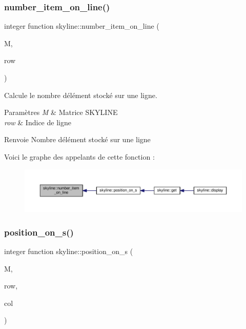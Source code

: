 \subsubsection{\texorpdfstring{number\+\_\+item\+\_\+on\+\_\+line()}{number\_item\_on\_line()}}
{\footnotesize\ttfamily integer function skyline\+::number\+\_\+item\+\_\+on\+\_\+line (\begin{DoxyParamCaption}\item[{class(\hyperlink{structskyline_1_1skyline__matrix}{skyline\+\_\+matrix}), intent(in)}]{M,  }\item[{integer, intent(in)}]{row }\end{DoxyParamCaption})}



Calcule le nombre d\textquotesingle{}élément stocké sur une ligne. 


\begin{DoxyParams}{Paramètres}
{\em M} & Matrice S\+K\+Y\+L\+I\+NE \\
\hline
{\em row} & Indice de ligne \\
\hline
\end{DoxyParams}
\begin{DoxyReturn}{Renvoie}
Nombre d\textquotesingle{}élément stocké sur une ligne 
\end{DoxyReturn}
Voici le graphe des appelants de cette fonction \+:
\nopagebreak
\begin{figure}[H]
\begin{center}
\leavevmode
\includegraphics[width=350pt]{namespaceskyline_a9f07218be321c12bea1d84f6b629e346_icgraph}
\end{center}
\end{figure}
\mbox{\label{namespaceskyline_a25b1e027d99abb67ab844d7b657a5843}} 
\subsubsection{\texorpdfstring{position\+\_\+on\+\_\+s()}{position\_on\_s()}}
{\footnotesize\ttfamily integer function skyline\+::position\+\_\+on\+\_\+s (\begin{DoxyParamCaption}\item[{class(\hyperlink{structskyline_1_1skyline__matrix}{skyline\+\_\+matrix}), intent(in)}]{M,  }\item[{integer, intent(in)}]{row,  }\item[{integer, intent(in)}]{col }\end{DoxyParamCaption})}




